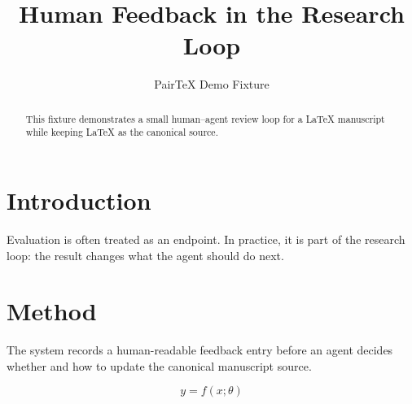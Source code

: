 \documentclass{article}
\begin{document}
\title{Human Feedback in the Research Loop}
\author{PairTeX Demo Fixture}
\maketitle
\begin{abstract}
This fixture demonstrates a small human--agent review loop for a LaTeX
manuscript while keeping LaTeX as the canonical source.
\end{abstract}
\section{Introduction}
Evaluation is often treated as an endpoint. In practice, it is part of the
research loop: the result changes what the agent should do next.

\section{Method}
The system records a human-readable feedback entry before an agent decides
whether and how to update the canonical manuscript source.

\begin{equation}
  y = f(x; \theta)
  \label{eq:demo}
\end{equation}
\end{document}
